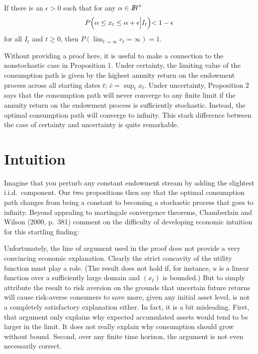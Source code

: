 \medskip
{}
If there is an $\epsilon >0$ such that for any $\alpha\in {{I\kern-0.3em R}}^+$
\offparens
$$
P\Bigl( \alpha \leq x_t \leq \alpha + \epsilon \Big| I_t \Bigl) < 1- \epsilon$$
for all $I_t$ and $t\geq0$, then $P(\lim_{t\to\infty} c_t = \infty)=1$.
\medskip

Without providing a proof here, it is useful to make a connection to
the nonstochastic case in Proposition 1. Under certainty, the limiting
value of the consumption path is given by the highest annuity return on  the
endowment process across all starting dates $t$; $\bar c = \sup_t x_t$.
Under uncertainty, Proposition 2 says that the consumption path will
never converge to any finite limit if the annuity return on  the endowment
process is sufficiently stochastic. Instead, the optimal consumption path
will  converge to infinity. This stark difference between the case of
certainty and uncertainty is quite remarkable.

\section{Intuition}

Imagine that you perturb any constant endowment stream by adding the slightest
i.i.d.\ component.  Our two propositions then say that  the optimal consumption
path changes from being a constant to becoming a stochastic process
that goes to infinity.  Beyond appealing to martingale convergence theorems,
 Chamberlain and Wilson (2000, p.\ 381) comment on the difficulty
of developing economic intuition for this startling finding:

{\narrower\smallskip\noindent
Unfortunately, the line of argument used in the proof does not provide
a very convincing economic explanation. Clearly the strict concavity
of the utility function must play a role. (The result does not hold if,
for instance, $u$ is a linear function over a sufficiently large domain
and $(x_t)$ is bounded.) But to simply attribute the result to risk
aversion on the grounds that uncertain future returns will cause
risk-averse consumers to save more, given any initial asset level, is
not a completely satisfactory explanation either. In fact, it is a bit
misleading. First, that argument only explains why expected accumulated
assets would tend to be larger in the limit. It does not really explain
why consumption should grow without bound. Second, over any finite time
horizon, the argument is not even necessarily correct. \smallskip}

